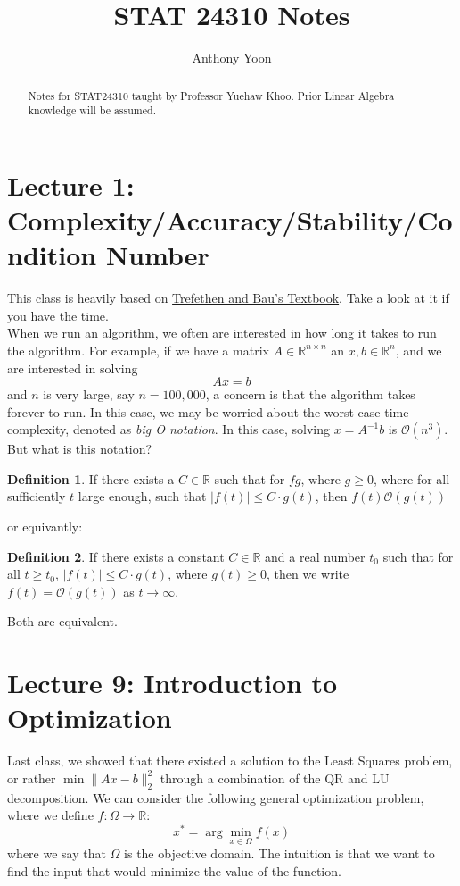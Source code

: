 \documentclass[11pt]{article}
\title{STAT 24310 Notes}
\author{Anthony Yoon}
\theoremstyle{definition}
\newtheorem{definition}{Definition}[section]
\newcommand{\R}{\mathbb{R}}
\begin{document}
\maketitle
\tableofcontents
\begin{abstract}
  Notes for STAT24310 taught by Professor Yuehaw Khoo. Prior Linear Algebra knowledge will be assumed. 
\end{abstract}
\newpage
\section{Lecture 1: Complexity/Accuracy/Stability/Condition Number}
This class is heavily based on \href{https://www.stat.uchicago.edu/~lekheng/courses/309/books/Trefethen-Bau.pdf}{Trefethen and Bau's Textbook}. Take a look at it if you have the time. \\
When we run an algorithm, we often are interested in how long it takes to run the algorithm. For example, if we have a matrix $A \in \R^{n \times n}$ an $x, b \in \R^n$, and we are interested in solving 
\[
Ax = b
\]
and $n$ is very large, say $ n = 100,000$, a concern is that the algorithm takes forever to run. In this case, we may be worried about the worst case time complexity, denoted as \emph{big O notation}. In this case, solving $x = A^{-1} b$ is $\mathcal{O}(n^3)$. But what is this notation? 
\begin{definition}
  If there exists a $C \in \R$ such that for $f g$, where $g \geq 0$, where for all sufficiently $t$ large enough, such that $|f(t)| \leq C \cdot g(t)$, then $f(t) \mathcal{O}(g(t))$ 
\end{definition}
or equivantly:
\begin{definition}
  If there exists a constant \( C \in \mathbb{R} \) and a real number \( t_0 \) such that for all \( t \geq t_0 \), \( |f(t)| \leq C \cdot g(t) \), where \( g(t) \geq 0 \), then we write \( f(t) = \mathcal{O}(g(t)) \) as \( t \to \infty \).
\end{definition}
Both are equivalent. 
\section{Lecture 9: Introduction to Optimization}
Last class, we showed that there existed a solution to the Least Squares problem, or rather $\min \|Ax - b\|^2_2$ through a combination of the QR and LU decomposition. We can consider the following general optimization problem, where we define $f: \Omega \to \R$:
\[
x^* = \arg \min_{x \in \Omega} f(x)
\]
where we say that $\Omega$ is the objective domain. The intuition is that we want to find the input that would minimize the value of the function. 
\end{document}
